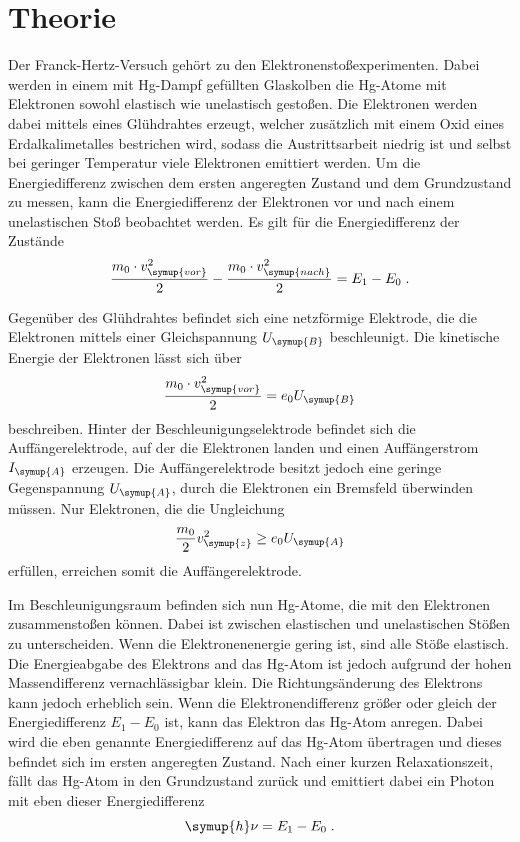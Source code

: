 \section{Theorie}
\label{sec:Theorie}

Der Franck-Hertz-Versuch gehört zu den Elektronenstoßexperimenten. Dabei werden in einem mit Hg-Dampf gefüllten Glaskolben die Hg-Atome mit Elektronen 
sowohl elastisch wie unelastisch gestoßen. Die Elektronen werden dabei mittels eines Glühdrahtes erzeugt, welcher zusätzlich mit einem Oxid eines 
Erdalkalimetalles bestrichen wird, sodass die Austrittsarbeit niedrig ist und selbst bei geringer Temperatur viele Elektronen emittiert werden.
Um die Energiedifferenz zwischen dem ersten angeregten Zustand und dem Grundzustand zu messen, kann die 
Energiedifferenz der Elektronen vor und nach einem unelastischen Stoß beobachtet werden. Es gilt für die Energiedifferenz der Zustände
\begin{equation*}
    \frac{m_0\cdot v^2_{\symup{vor}}}{2} - \frac{m_0\cdot v^2_{\symup{nach}}}{2} = E_1 - E_0 \; .
\end{equation*}

Gegenüber des Glühdrahtes befindet sich eine netzförmige Elektrode, die die Elektronen mittels einer Gleichspannung $U_{\symup{B}}$ beschleunigt. 
Die kinetische Energie der Elektronen lässt sich über 
\begin{equation*}
    \frac{m_0\cdot v^2_{\symup{vor}}}{2} = e_0U_{\symup{B}}
\end{equation*}
beschreiben.
Hinter der Beschleunigungselektrode befindet sich die Auffängerelektrode, auf der die Elektronen landen und einen Auffängerstrom $I_{\symup{A}}$ erzeugen.
Die Auffängerelektrode besitzt jedoch eine geringe Gegenspannung $U_{\symup{A}}$, durch die Elektronen ein Bremsfeld überwinden müssen. Nur Elektronen, 
die die Ungleichung
\begin{equation*}
    \frac{m_0}{2}v^2_{\symup{z}} \geq e_0U_{\symup{A}}
\end{equation*}
erfüllen, erreichen somit die Auffängerelektrode. 

Im Beschleunigungsraum befinden sich nun Hg-Atome, die mit den Elektronen zusammenstoßen können. Dabei ist zwischen elastischen und unelastischen Stößen 
zu unterscheiden. Wenn die Elektronenenergie gering ist, sind alle Stöße elastisch. Die Energieabgabe des Elektrons and das Hg-Atom ist jedoch aufgrund 
der hohen Massendifferenz vernachlässigbar klein. Die Richtungsänderung des Elektrons kann jedoch erheblich sein. 
Wenn die Elektronendifferenz größer oder gleich der Energiedifferenz $E_1 - E_0$ ist, kann das Elektron das Hg-Atom anregen. Dabei wird die eben 
genannte Energiedifferenz auf das Hg-Atom übertragen und dieses befindet sich im ersten angeregten Zustand. Nach einer kurzen Relaxationszeit, fällt
das Hg-Atom in den Grundzustand zurück und emittiert dabei ein Photon mit eben dieser Energiedifferenz
\begin{equation*}
    \symup{h}\nu = E_1 - E_0 \; .
\end{equation*}

